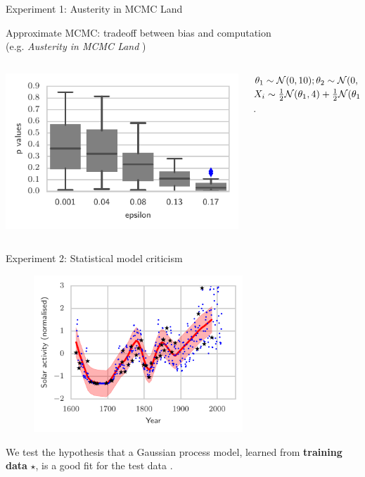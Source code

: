 \documentclass{beamer}
\begin{document}
\begin{frame}{Experiment 1: Austerity in MCMC Land}
 \begin{center}
   Approximate MCMC: tradeoff between bias and computation\\ (e.g. {\em Austerity in MCMC Land} \cite{korattikara2013austerity})
   \end{center}
\begin{columns}
        \begin{column}{.7\textwidth}
   \includegraphics[width=\textwidth]{img/Heiko1} 
        \end{column}
        \begin{column}{.3\textwidth}
$\theta_{1}\sim{\cal N}(0,10);\theta_{2}\sim{\cal N}(0,1)$\\
$ X_{i}\sim\frac{1}{2}{\cal N}(\theta_{1},4)+\frac{1}{2}{\cal N}(\theta_{1}+\theta_{2},4) $.
        \end{column}
\end{columns}
 \end{frame}
 

 

  
    \begin{frame}{Experiment 2: Statistical model criticism}
        \begin{figure}
           \includegraphics[width= 0.7\textwidth]{img/gp_regression_data_fit.pdf}  
        \end{figure}
We test the hypothesis that a Gaussian process {\color{red} model}, learned from \textbf{training data} $\star$, is a good fit for the {\color{blue} test data} \cite{lloyd2015statistical}.
  \end{frame}
\end{document}
